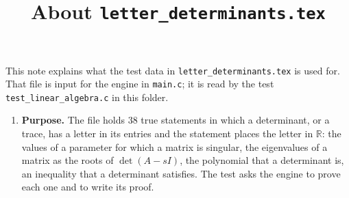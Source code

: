 \documentclass[11pt,a4paper]{article}
\title{About \texttt{letter\_determinants.tex}}
\author{}
\date{}
\begin{document}
\maketitle
This note explains what the test data in \texttt{letter\_determinants.tex} is used for. That file is input for the engine in \texttt{main.c}; it is read by the test \texttt{test\_linear\_algebra.c} in this folder.

\begin{enumerate}
\item \textbf{Purpose.} The file holds 38 true statements in which a determinant, or a trace, has a letter in its entries and the statement places the letter in $\mathbb{R}$: the values of a parameter for which a matrix is singular, the eigenvalues of a matrix as the roots of $\det(A - sI)$, the polynomial that a determinant is, an inequality that a determinant satisfies. The test asks the engine to prove each one and to write its proof.


\end{enumerate}
\end{document}
